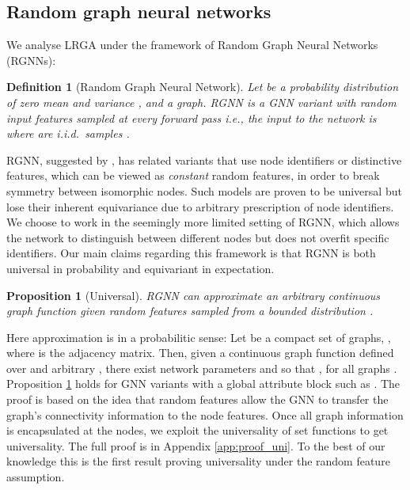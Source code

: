 \documentclass{article} \usepackage{iclr2021_conference,times}
\newcommand{\ie}{{i.e.}}
\newtheorem{proposition}{Proposition}
\newtheorem{definition}{Definition}
\begin{document}
\subsection{Random graph neural networks}

We analyse LRGA under the framework of Random Graph Neural Networks (RGNNs):
\begin{definition}[Random Graph Neural Network] Let  be a probability distribution of zero mean and variance , and  a graph. RGNN is a GNN variant with random input features sampled at every forward pass \ie, the input to the network is  where  are i.i.d.~samples .
\end{definition}



RGNN, suggested by \cite{sato2020random}, has related variants \citep{loukas2020hard, loukas2019graph, murphy2019relational} that use node identifiers or distinctive features, which can be viewed as \emph{constant} random features, in order to break symmetry between isomorphic nodes. Such models are proven to be universal but lose their inherent equivariance due to arbitrary prescription of node identifiers. We choose to work in the seemingly more limited setting of RGNN, which allows the network to distinguish between different nodes but does not overfit specific identifiers. Our main claims regarding this framework is that RGNN is both universal in probability and equivariant in expectation. 






\begin{proposition}[Universal]\label{prop:universalGNNS}
RGNN can approximate an arbitrary continuous graph function given random features sampled from a bounded distribution .
\end{proposition}
Here approximation is in a probabilitic sense: Let  be a compact set of graphs, , where  is the adjacency matrix. Then, given a continuous graph function  defined over  and arbitrary , there exist network parameters and  so that , for all graphs . 
Proposition \ref{prop:universalGNNS} holds for GNN variants with a global attribute block such as \citep{battaglia2018relational}. The proof is based on the idea that random features  allow the GNN to transfer the graph's connectivity information to the node features. Once all graph information is encapsulated at the nodes, we exploit the universality of set functions \citep{zaheer2017deep} to get universality. The full proof is in Appendix \ref{app:proof_uni}. To the best of our knowledge this is the first result proving universality under the random feature assumption. 
 
\end{document}
